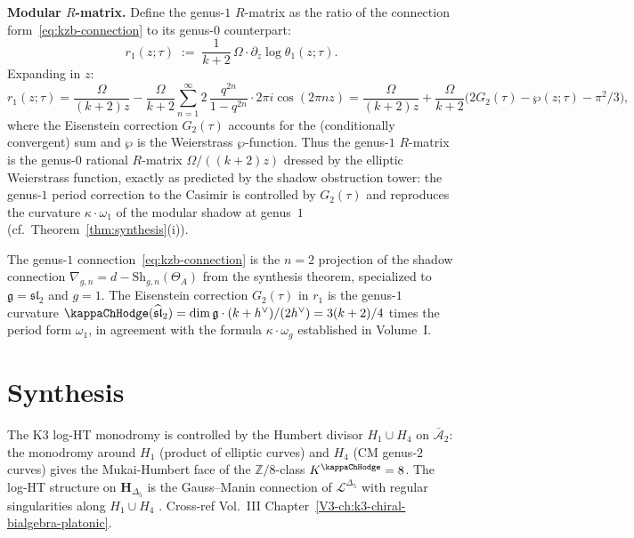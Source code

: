 \begin{computation}
\medskip\noindent\textbf{Modular $R$-matrix.}\;
Define the genus-$1$ $R$-matrix as the ratio of the connection
form~\eqref{eq:kzb-connection} to its genus-$0$ counterpart:
\begin{equation}%
 r_1(z;\tau) \;:=\; \frac{1}{k+2}\,\Omega\cdot \partial_z\!\log\theta_1(z;\tau).
\end{equation}
Expanding in $z$:
\[
 r_1(z;\tau)
 = \frac{\Omega}{(k+2)z}
 - \frac{\Omega}{k+2}\sum_{n=1}^{\infty}2\,
 \frac{q^{2n}}{1-q^{2n}}\cdot 2\pi i\cos(2\pi nz)
 = \frac{\Omega}{(k+2)z}
 + \frac{\Omega}{k+2}\bigl(2G_2(\tau)-\wp(z;\tau)-\pi^2/3\bigr),
\]
where the Eisenstein correction $G_2(\tau)$ accounts for the
(conditionally convergent) sum and $\wp$ is the Weierstrass
$\wp$-function. Thus the genus-$1$ $R$-matrix is the genus-$0$
rational $R$-matrix $\Omega/((k+2)z)$ dressed by the elliptic
Weierstrass function, exactly as predicted by the shadow obstruction tower:
the genus-$1$ period correction to the Casimir is controlled by
$G_2(\tau)$ and reproduces the curvature $\kappa\cdot\omega_1$
of the modular shadow at genus~$1$
(cf.\ Theorem~\ref{thm:synthesis}\textup{(i)}).
\end{computation}

\begin{remark}
The genus-$1$ connection~\eqref{eq:kzb-connection} is the $n=2$ projection
of the shadow connection $\nabla_{g,n}=d-\mathrm{Sh}_{g,n}(\Theta_A)$
from the synthesis theorem, specialized to $\mathfrak{g}=\mathfrak{sl}_2$
and $g=1$. The Eisenstein correction $G_2(\tau)$ in $r_1$
is the genus-$1$ curvature $\kappaChHodge(\widehat{\mathfrak{sl}}_2)
=\dim\mathfrak{g}\cdot(k+h^\vee)/(2h^\vee)=3(k+2)/4$
times the period form $\omega_1$, in agreement with the formula
$\kappa\cdot\omega_g$ established in Volume~I.
\end{remark}


\section{Synthesis}
\label{sec:lhm-supplement}

\begin{remark}
\label{rem:lhm-1}
The K3 log-HT monodromy is controlled by the Humbert divisor
$H_1\cup H_4$ on $\bar{\mathcal A}_2$: the monodromy around $H_1$
(product of elliptic curves) and $H_4$ (CM genus-$2$ curves) gives the
Mukai-Humbert face of the $\mathbb Z/8$-class
$K^{\kappaChHodge} = 8$. The log-HT structure on
$\mathbf H_{\Delta_5}$ is the Gauss--Manin connection of
$\mathcal L^{\Delta_5}$ with regular singularities along $H_1\cup H_4$
\cite{Bruinier2002,GritsenkoNikulin1998}. Cross-ref Vol.~III
Chapter~\ref{V3-ch:k3-chiral-bialgebra-platonic}.
\end{remark}

